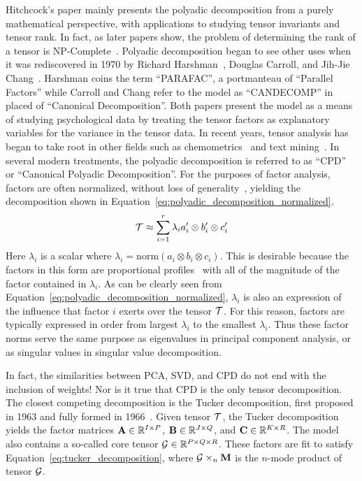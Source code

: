 \documentclass[../dissertation.tex]{subfiles}
\begin{document}
Hitchcock's paper mainly presents the polyadic decomposition from a
purely mathematical perspective, with applications to studying tensor
invariants and tensor rank.  In fact, as later papers show, the
problem of determining the rank of a tensor is
NP-Complete~\cite{haastad1990}.  Polyadic decomposition began to see
other uses when it was rediscovered in 1970 by Richard
Harshman~\cite{harshman1970}, Douglas Carroll, and Jih-Jie
Chang~\cite{carroll1970}.  Harshman coins the term ``PARAFAC'', a
portmanteau of ``Parallel Factors'' while Carroll and Chang refer to
the model as ``CANDECOMP'' in placed of ``Canonical Decomposition''.
Both papers present the model as a means of studying psychological
data by treating the tensor factors as explanatory variables for the
variance in the tensor data.  In recent years, tensor analysis has
began to take root in other fields such as chemometrics~\cite{bro1997}
and text mining~\cite{bader2007}.  In several modern treatments, the
polyadic decomposition is referred to as ``CPD'' or ``Canonical
Polyadic Decomposition''.  For the purposes of factor analysis,
factors are often normalized, without loss of
generality~\cite{bro1997, bader2007}, yielding the decomposition shown
in Equation~\ref{eq:polyadic_decomposition_normalized}.
\begin{equation} \label{eq:polyadic_decomposition_normalized}
  \mathcal{T} \approx \displaystyle\sum_{i=1}^{r} \lambda_i a'_i
  \otimes b'_i \otimes c'_i
\end{equation}
Here $\lambda_i$ is a scalar where $\lambda_i = \mathrm{norm}(a_i
\otimes b_i \otimes c_i)$.  This is desirable because the factors in
this form are proportional profiles~\cite{harshman1970} with all of
the magnitude of the factor contained in $\lambda_i$.  As can be
clearly seen from Equation~\ref{eq:polyadic_decomposition_normalized},
$\lambda_i$ is also an expression of the influence that factor $i$
exerts over the tensor $\mathcal{T}$.  For this reason, factors are
typically expressed in order from largest $\lambda_i$ to the smallest
$\lambda_i$.  Thus these factor norms serve the same purpose as
eigenvalues in principal component analysis, or as singular values in
singular value decomposition.

In fact, the similarities between PCA, SVD, and CPD do not end with
the inclusion of weights!  Nor is it true that CPD is the only tensor
decomposition.  The closest competing decomposition is the Tucker
decomposition, first proposed in 1963 and fully formed in
1966~\cite{kolda2009}.  Given tensor $\mathcal{T}$, the Tucker
decomposition yields the factor matrices $\mathrm{\bf 
  A}\in\mathbb{R}^{I\times P}$, $\mathrm{\bf  B} \in
\mathbb{R}^{J\times Q}$, and $\mathrm{\bf  C}\in
\mathbb{R}^{K\times R}$.  The model also contains a so-called core
tensor $\mathcal{G} \in \mathbb{R}^{P\times Q \times R}$.  These
factors are fit to satisfy Equation~\ref{eq:tucker_decomposition},
where $\mathcal{G} \times_n \mathrm{\bf  M}$ is the $n$-mode product of
tensor $\mathcal{G}$.  
\end{document}

